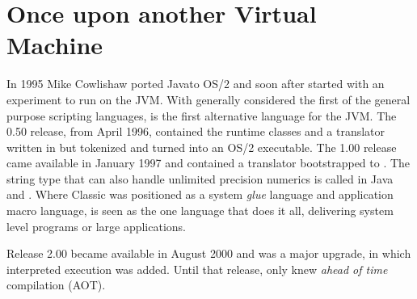 \section{Once upon another Virtual Machine}
In 1995 Mike Cowlishaw ported Java\texttrademark to OS/2\textsuperscript{\texttrademark} and soon after started with
an experiment to run \Rexx{} on the JVM\textsuperscript{\texttrademark}. With \Rexx{} generally considered
the first of the general purpose scripting languages, \nr{}\textsuperscript{\texttrademark}  is the
first alternative language for the JVM. The 0.50 release, from April
1996, contained the \nr{} runtime classes and a translator written
in \Rexx{} but tokenized and turned into an OS/2 executable. The 1.00
release came available in January 1997 and contained a translator
bootstrapped to \nr{}. The \Rexx{} string type that can also handle
unlimited precision numerics is called \Rexx{} in Java and \nr{}.
Where Classic \Rexx{} was positioned as a system \emph{glue} language and
application macro language, \nr{} is seen as the one language that
does it all, delivering system level programs or large applications.

Release 2.00 became available in August 2000 and was a major upgrade,
in which interpreted execution was added. Until that release, \nr{}
only knew \emph{ahead of time} compilation (AOT).

